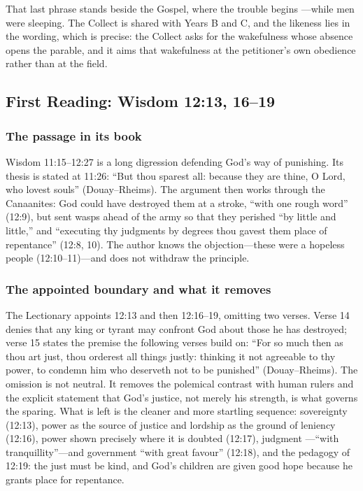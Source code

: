 That last phrase stands beside the Gospel, where the trouble begins
---while men were sleeping. The Collect is
shared with Years B and C, and the likeness lies in the wording, which is
precise: the Collect asks for the wakefulness whose
absence opens the parable, and it aims that wakefulness at the petitioner's own
obedience rather than at the field.

\subsection*{First Reading: Wisdom 12:13, 16--19}

\subsubsection*{The passage in its book}

Wisdom 11:15--12:27 is a long digression defending God's way of punishing.
Its thesis is stated at 11:26: ``But thou sparest all: because they are thine,
O Lord, who lovest souls'' (Douay--Rheims). The argument then works through
the Canaanites: God could have destroyed them at a stroke, ``with one rough
word'' (12:9), but sent wasps ahead of the army so that they perished ``by
little and little,'' and ``executing thy judgments by degrees thou gavest them
place of repentance'' (12:8, 10). The author knows the objection---these were
a hopeless people (12:10--11)---and does not withdraw the principle.

\subsubsection*{The appointed boundary and what it removes}

The Lectionary appoints 12:13 and then 12:16--19, omitting two verses. Verse
14 denies that any king or tyrant may confront God about those he has
destroyed; verse 15 states the premise the following verses build on:
``For so much then as thou art just, thou orderest all things justly:
thinking it not agreeable to thy power, to condemn him who deserveth not to be
punished'' (Douay--Rheims). The omission is not neutral. It removes the
polemical contrast with human rulers and the explicit statement that God's
justice, not merely his strength, is what governs the sparing. What is left is
the cleaner and more startling sequence: sovereignty (12:13), power as the
source of justice and lordship as the ground of leniency (12:16), power shown
precisely where it is doubted (12:17), judgment ---``with tranquillity''---and government ``with great favour''
(12:18), and the pedagogy of 12:19: the just must be kind, and God's children
are given good hope because he grants place for repentance.

